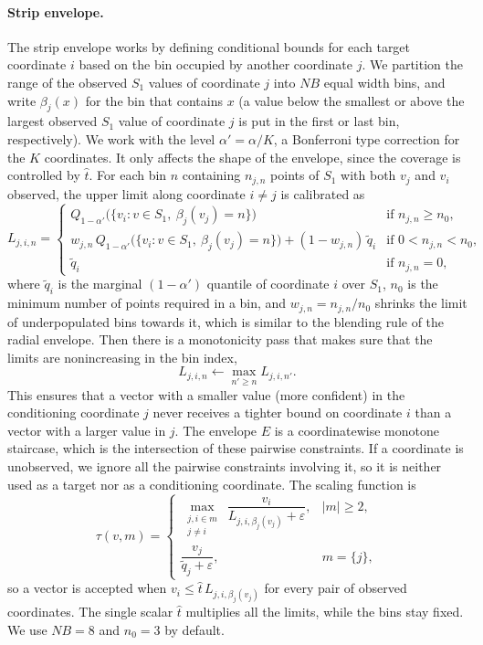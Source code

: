 \paragraph{Strip envelope.} The strip envelope works by defining conditional bounds for each target coordinate $i$ based on the 
bin occupied by another coordinate $j$. We partition the range of the observed $S_1$ values of coordinate $j$ into $NB$ equal width 
bins, and write $\beta_j(x)$ for the bin that contains $x$ (a value below the smallest or above the largest observed $S_1$ value of 
coordinate $j$ is put in the first or last bin, respectively). We work with the level $\alpha'=\alpha/K$, a Bonferroni type correction 
for the $K$ coordinates. It only affects the shape of the envelope, since the coverage is controlled by $\hat t$. For each bin $n$ 
containing $n_{j,n}$ points of $S_1$ with both $v_j$ and $v_i$ observed, the upper limit along coordinate $i\neq j$ is calibrated as
\begin{equation}\label{eq:limits}
L_{j,i,n}=\begin{cases}
Q_{1-\alpha'}\bigl(\{v_i:v\in S_1,\ \beta_j(v_j)=n\}\bigr) & \text{if } n_{j,n}\ge n_0,\\[1ex]
w_{j,n}\,Q_{1-\alpha'}\bigl(\{v_i:v\in S_1,\ \beta_j(v_j)=n\}\bigr)+(1-w_{j,n})\,\tilde q_i & \text{if } 0<n_{j,n}<n_0,\\[1ex]
\tilde q_i & \text{if } n_{j,n}=0,
\end{cases}
\end{equation}
where $\tilde q_i$ is the marginal $(1-\alpha')$ quantile of coordinate $i$ over $S_1$, $n_0$ is the minimum number of points required 
in a bin, and $w_{j,n}=n_{j,n}/n_0$ shrinks the limit of underpopulated bins towards it, which is similar to the blending rule of the 
radial envelope. Then there is a monotonicity pass that makes sure that the limits are nonincreasing in the bin index,
\begin{equation}\label{eq:monotone}
L_{j,i,n}\leftarrow\max_{n'\ge n}L_{j,i,n'}.
\end{equation}
This ensures that a vector with a smaller value (more confident) in the conditioning coordinate $j$ never receives a tighter bound 
on coordinate $i$ than a vector with a larger value in $j$. The envelope $E$ is a coordinatewise monotone staircase, which is the intersection of these 
pairwise constraints. If a coordinate is unobserved, we ignore all the pairwise constraints involving it, so it is neither used as 
a target nor as a conditioning coordinate. The scaling function is
\begin{equation}\label{eq:strip}
\tau(v,m)=\begin{cases}
\displaystyle\max_{\substack{j,i\in m\\ j\ne i}}\ \dfrac{v_i}{L_{j,i,\beta_j(v_j)}+\varepsilon}, & |m|\ge 2,\\[3ex]
\dfrac{v_j}{\tilde q_j+\varepsilon}, & m=\{j\},
\end{cases}
\end{equation}
so a vector is accepted when $v_i\le\hat t\,L_{j,i,\beta_j(v_j)}$ for every pair of observed coordinates. The single scalar 
$\hat t$ multiplies all the limits, while the bins stay fixed. We use $NB=8$ and $n_0=3$ by default.

